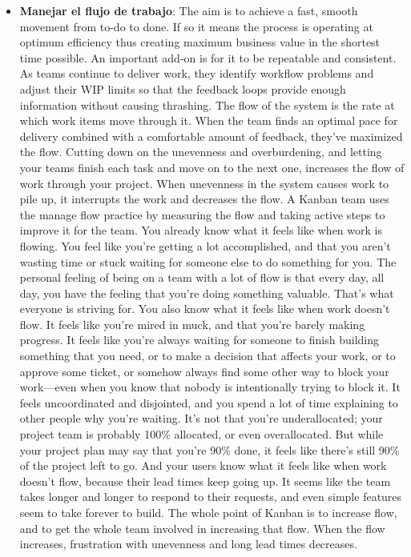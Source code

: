 \begin{itemize}
    \item \textbf{Manejar el flujo de trabajo}: %
    The aim is to achieve a fast,
    smooth movement from to-do to done. If so it means the
    process is operating at optimum efficiency thus creating
    maximum business value in the shortest time possible. An
    important add-on is for it to be repeatable and consistent.
    As teams continue to deliver work, they identify workflow problems and adjust their
WIP limits so that the feedback loops provide enough information without causing
thrashing. The flow of the system is the rate at which work items move through it.
When the team finds an optimal pace for delivery combined with a comfortable
amount of feedback, they've maximized the flow. Cutting down on the unevenness
and overburdening, and letting your teams finish each task and move on to the next
one, increases the flow of work through your project. When unevenness in the system
causes work to pile up, it interrupts the work and decreases the flow. A Kanban team
uses the manage flow practice by measuring the flow and taking active steps to
improve it for the team.
You already know what it feels like when work is flowing. You feel like you're getting a
    lot accomplished, and that you aren't wasting time or stuck waiting for
    someone else to do something for you. The personal feeling of being on a team with a lot of flow is
    that every day, all day, you have the feeling that you're doing something valuable.
    That's what everyone is striving for.
    You also know what it feels like when work doesn't flow. It feels like you're mired in
    muck, and that you're barely making progress. It feels like you're always waiting for
    someone to finish building something that you need, or to make a decision that
    affects your work, or to approve some ticket, or somehow always find some other way
    to block your work—even when you know that nobody is intentionally trying to
    block it. It feels uncoordinated and disjointed, and you spend a lot of time explaining
    to other people why you're waiting. It's not that you're underallocated; your project
    team is probably 100\% allocated, or even overallocated. But while your project plan
    may say that you're 90\% done, it feels like there's still 90\% of the project left to go.
    And your users know what it feels like when work doesn't flow, because their lead
    times keep going up. It seems like the team takes longer and longer to respond to
    their requests, and even simple features seem to take forever to build.
    The whole point of Kanban is to increase flow, and to get the whole team involved in
    increasing that flow. When the flow increases, frustration with unevenness and long
    lead times decreases.


\end{itemize}
